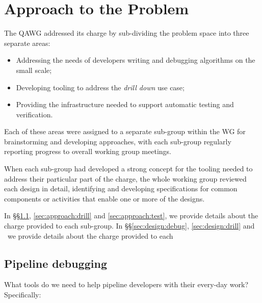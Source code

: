 \section{Approach to the Problem}
\label{sec:approach}


The QAWG addressed its charge by sub-dividing the problem space into three separate areas:

\begin{itemize}

  \item{Addressing the needs of developers writing and debugging algorithms on the small scale;}
  \item{Developing tooling to address the \textit{\gls{drill down}} use case;}
  \item{Providing the infrastructure needed to support automatic testing and verification.}

\end{itemize}

Each of these areas were assigned to a separate sub-group within the WG for
brainstorming and developing approaches, with each sub-group regularly
reporting progress to overall working group meetings.

When each sub-group had developed a strong concept for the tooling needed to
address their particular part of the charge, the whole working group reviewed
each design in detail, identifying and developing specifications for common
components or activities that enable one or more of the designs.

In \S\S\ref{sec:approach:debug}, \ref{sec:approach:drill} and
\ref{sec:approach:test}, we provide details about the charge provided to each
sub-group. In \S\S\ref{sec:design:debug}, \ref{sec:design:drill} and \ we provide details about the charge provided to each

\subsection{Pipeline debugging}
\label{sec:approach:debug}


What tools do we need to help pipeline developers with their every-day work?
Specifically:

